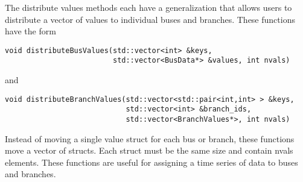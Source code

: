 The distribute values methods each have a generalization that allows users to distribute a vector of values to individual buses and branches. These functions have the form

{
\color{red}
\begin{Verbatim}[fontseries=b]
void distributeBusValues(std::vector<int> &keys,
                         std::vector<BusData*> &values, int nvals)
\end{Verbatim}
}

and

{
\color{red}
\begin{Verbatim}[fontseries=b]
void distributeBranchValues(std::vector<std::pair<int,int> > &keys,
                            std::vector<int> &branch_ids,
                            std::vector<BranchValues*>, int nvals)
\end{Verbatim}
}

Instead of moving a single value struct for each bus or branch, these functions move a vector of structs. Each struct must be the same size and contain nvals elements. These functions are useful for assigning a time series of data to buses and branches.
